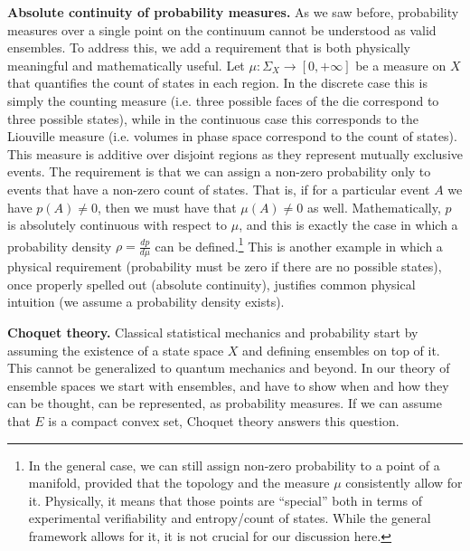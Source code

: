 \documentclass[10pt,twocolumn, nofootinbib]{revtex4-2}
\begin{document}
\textbf{Absolute continuity of probability measures.} As we saw before, probability measures over a single point on the continuum cannot be understood as valid ensembles. To address this, we add a requirement that is both physically meaningful and mathematically useful. Let $\mu : \Sigma_X \to [0, + \infty]$ be a measure on $X$ that quantifies the count of states in each region. In the discrete case this is simply the counting measure (i.e. three possible faces of the die correspond to three possible states), while in the continuous case this corresponds to the Liouville measure (i.e. volumes in phase space correspond to the count of states). This measure is additive over disjoint regions as they represent mutually exclusive events. The requirement is that we can assign a non-zero probability only to events that have a non-zero count of states. That is, if for a particular event $A$ we have $p(A) \neq 0$, then we must have that $\mu(A) \neq 0$ as well. Mathematically, $p$ is absolutely continuous with respect to $\mu$, and this is exactly the case in which a probability density $\rho = \frac{dp}{d\mu}$ can be defined.\footnote{In the general case, we can still assign non-zero probability to a point of a manifold, provided that the topology and the measure $\mu$ consistently allow for it. Physically, it means that those points are ``special'' both in terms of experimental verifiability and entropy/count of states. While the general framework allows for it, it is not crucial for our discussion here.} This is another example in which a physical requirement (probability must be zero if there are no possible states), once properly spelled out (absolute continuity), justifies common physical intuition (we assume a probability density exists).

\textbf{Choquet theory.} Classical statistical mechanics and probability start by assuming the existence of a state space $X$ and defining ensembles on top of it. This cannot be generalized to quantum mechanics and beyond. In our theory of ensemble spaces we start with ensembles, and have to show when and how they can be thought, can be represented, as probability measures. If we can assume that $E$ is a compact convex set, Choquet theory answers this question.
\end{document}
